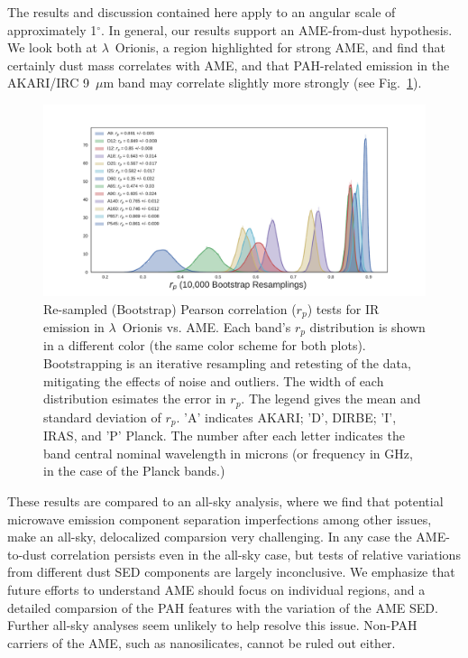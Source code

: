 \documentclass[11pt,a4paper]{article}
\numberwithin{equation}{section}
\begin{document}
 The results and discussion contained here apply to an angular scale of approximately 1$^{\circ}$. In general, our results support an AME-from-dust hypothesis. We look both at $\lambda$~Orionis, a region highlighted for strong AME, and find that certainly dust mass correlates with AME, and that PAH-related emission in the AKARI/IRC 9~$\mu$m band may correlate slightly more strongly (see Fig.~\ref{fig:bootstrap_vs_AME}).
   \begin{figure}
     \includegraphics[width=\textwidth,trim={3cm 0.25cm 2.5cm 1cm},clip]{../Plots/ch_lori/bootstrap_vs_AME_pearson_i10000.pdf}
     \centering
     \caption{Re-sampled (Bootstrap) Pearson correlation ($r_{p}$) tests for IR emission in $\lambda$~Orionis vs. AME. Each band's $r_p$ distribution is shown in a different color (the same color scheme for both plots). Bootstrapping is an iterative resampling and retesting of the data, mitigating the effects of noise and outliers. The width of each distribution esimates the error in $r_{p}$. The legend gives the mean and standard deviation of $r_{p}$. 'A' indicates AKARI; 'D', DIRBE; 'I', IRAS, and 'P' Planck. The number after each letter indicates the band central nominal wavelength in microns (or frequency in GHz, in the case of the Planck bands.)}
     \label{fig:bootstrap_vs_AME}
   \end{figure}
 These results are compared to an all-sky analysis, where we find that potential microwave emission component separation imperfections among other issues, make an all-sky, delocalized comparsion very challenging. In any case the AME-to-dust correlation persists even in the all-sky case, but tests of relative variations from different dust SED components are largely inconclusive. We emphasize that future efforts to understand AME should focus on individual regions, and a detailed comparsion of the PAH features with the variation of the AME SED. Further all-sky analyses seem unlikely to help resolve this issue. Non-PAH carriers of the AME, such as nanosilicates, cannot be ruled out either.

\small


\end{document}
